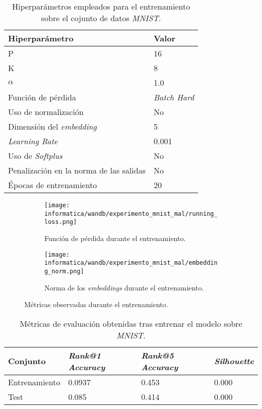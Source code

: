 \begin{table}[!hbtp]
\centering
\begin{tabular}{|l|l|}
    \hline
    Hiperparámetro & Valor \\
    \hline

    P & 16 \\
    K & 8 \\
    $\alpha$ & 1.0 \\
    Función de pérdida & \textit{Batch Hard} \\
    Uso de normalización & No \\
    Dimensión del \textit{embedding} & 5 \\
    \textit{Learning Rate} & 0.001 \\
    Uso de \textit{Softplus} & No \\
    Penalización en la norma de las salidas & No \\
    Épocas de entrenamiento & 20 \\
    \hline
\end{tabular}
\caption{Hiperparámetros empleados para el entrenamiento sobre el cojunto de datos \textit{MNIST}.}
    \label{table:hiperparametros_mnist_mal}
\end{table}

\begin{figure}
\ajustarsubcaptions
\centering
    \begin{subfigure}{.5\textwidth}
        \centering
        \texttt{[image: informatica/wandb/experimento\_mnist\_mal/running\_loss.png]}
        \caption{Función de pérdida durante el entrenamiento.}
    \end{subfigure}%
    \begin{subfigure}{.5\textwidth}
        \centering
        \texttt{[image: informatica/wandb/experimento\_mnist\_mal/embedding\_norm.png]}
        \caption{Norma de los \textit{embeddings} durante el entrenamiento.}
    \end{subfigure}
    \label{img:progreso_entrenamiento_mnist_mal}
\caption{Métricas observadas durante el entrenamiento.}
\end{figure}


\begin{table}[H]
\centering
\begin{tabular}{|l|l|l|l|}
    \hline
    Conjunto & \textit{Rank@1 Accuracy} & \textit{Rank@5 Accuracy} & \textit{Silhouette} \\
    \hline

    Entrenamiento & 0.0937 & 0.453 &  0.000 \\
    Test & 0.085 & 0.414 &  0.000  \\


    \hline

\end{tabular}
\caption{Métricas de evaluación obtenidas tras entrenar el modelo sobre \textit{MNIST}.}
    \label{table:resultados_mnist_mal}
\end{table}

